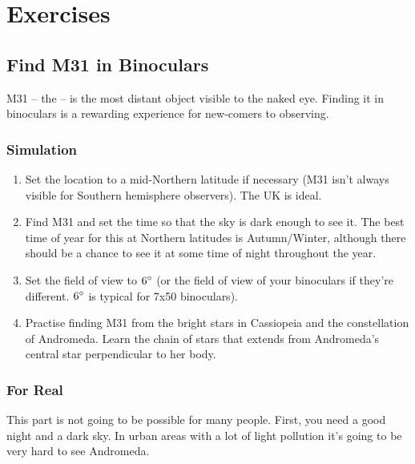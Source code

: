 
\chapter{Exercises}
\label{ch:Exercises}

\section{Find M31 in Binoculars}
\label{sec:Exercises:M31}

M31 -- the  -- is
the most distant object visible to the naked eye. Finding it in
binoculars is a rewarding experience for new-comers to observing.

\subsection{Simulation}

\begin{enumerate}
\item
  Set the location to a mid-Northern latitude if necessary (M31 isn't
  always visible for Southern hemisphere observers). The UK is ideal.
\item Find M31 and set the time so that the sky is dark enough to see
  it.  The best time of year for this at Northern latitudes is
  Autumn/Winter, although there should be a chance to see it at some
  time of night throughout the year.
\item Set the field of view to $6\degree$ (or the field of view of
  your binoculars if they're different. $6\degree$ is typical for 7x50
  binoculars).
\item Practise finding M31 from the bright stars in Cassiopeia and the
  constellation of Andromeda. Learn the chain of stars that extends
  from Andromeda's central star perpendicular to her body.
\end{enumerate}

\subsection{For Real}

This part is not going to be possible for many people. First, you need a
good night and a dark sky. In urban areas with a lot of light pollution
it's going to be very hard to see Andromeda.

